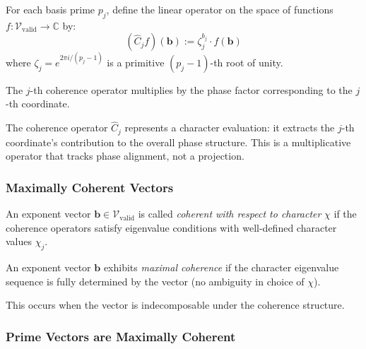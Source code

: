 \begin{definition}
For each basis prime $p_j$, define the linear operator on the space of functions $f: \mathcal{V}_{\text{valid}} \to \mathbb{C}$ by:
\begin{equation}
(\hat{C}_j f)(\mathbf{b}) := \zeta_j^{b_j} \cdot f(\mathbf{b})
\end{equation}
where $\zeta_j = e^{2\pi i / (p_j - 1)}$ is a primitive $(p_j - 1)$-th root of unity.

The $j$-th coherence operator multiplies by the phase factor corresponding to the $j$-th coordinate.
\end{definition}

\begin{observation}
The coherence operator $\hat{C}_j$ represents a character evaluation: it extracts the $j$-th coordinate's contribution to the overall phase structure. This is a multiplicative operator that tracks phase alignment, not a projection.
\end{observation}

\subsubsection{Maximally Coherent Vectors}

\begin{definition}
An exponent vector $\mathbf{b} \in \mathcal{V}_{\text{valid}}$ is called \emph{coherent with respect to character} $\chi$ if the coherence operators satisfy eigenvalue conditions with well-defined character values $\chi_j$.
\end{definition}

\begin{definition}
An exponent vector $\mathbf{b}$ exhibits \emph{maximal coherence} if the character eigenvalue sequence is fully determined by the vector (no ambiguity in choice of $\chi$).

This occurs when the vector is indecomposable under the coherence structure.
\end{definition}

\subsubsection{Prime Vectors are Maximally Coherent}


